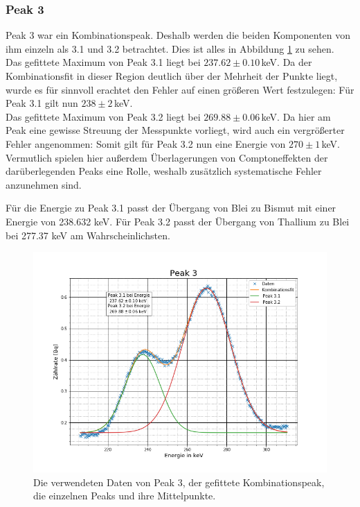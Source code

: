 \subsubsection{Peak 3}
Peak 3 war ein Kombinationspeak. Deshalb werden die beiden Komponenten von ihm einzeln als 3.1 und 3.2 betrachtet. Dies ist alles in Abbildung \ref{p3} zu sehen.\\
Das gefittete Maximum von Peak 3.1 liegt bei $237.62\pm0.10\,$keV. Da der Kombinationsfit in dieser Region deutlich über der Mehrheit der Punkte liegt, wurde es für sinnvoll erachtet den Fehler auf einen größeren Wert festzulegen: Für Peak 3.1 gilt nun $238\pm2\,$keV.\\
Das gefittete Maximum von Peak 3.2 liegt bei $269.88\pm0.06\,$keV. Da hier am Peak eine gewisse Streuung der Messpunkte vorliegt, wird auch ein vergrößerter Fehler angenommen: Somit gilt für Peak 3.2 nun eine Energie von
$270\pm1\,$keV. Vermutlich spielen hier außerdem Überlagerungen von Comptoneffekten der darüberlegenden Peaks eine Rolle, weshalb zusätzlich systematische Fehler anzunehmen sind. \cite{staatsex_szinti} \par
Für die Energie zu Peak 3.1 passt der Übergang von Blei zu Bismut \cite{Blei} mit einer Energie von 238.632 keV. Für Peak 3.2 passt der Übergang von Thallium zu Blei bei 277.37 keV \cite{Thallium} am Wahrscheinlichsten. 


\begin{figure}[h]
	\centering
	\includegraphics[scale=0.7]{Bilder/Anhang/P3}
	\caption[Thorium Peak 3]{\small Die verwendeten Daten von Peak 3, der gefittete Kombinationspeak, die einzelnen Peaks und ihre Mittelpunkte.}
	\label{p3}
\end{figure}
\FloatBarrier
